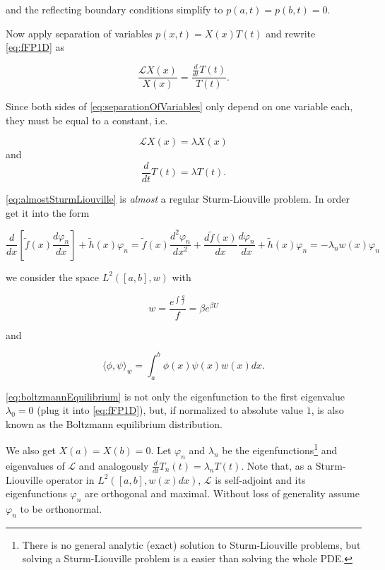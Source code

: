and the reflecting boundary conditions simplify to $p(a,t)=p(b,t)=0$.

Now apply separation of variables $p(x,t)=X(x)T(t)$ and rewrite \eqref{eq:fFP1D} as

\begin{equation}\label{eq:separationOfVariables}
\frac{\mathcal{L}X(x)}{X(x)} = \frac{\frac{d}{dt}T(t)}{T(t)}.
\end{equation}

Since both sides of \eqref{eq:separationOfVariables} only depend on one variable each, they must be equal to a constant, i.e.

\begin{equation}\label{eq:almostSturmLiouville}
\mathcal{L}X(x) = \lambda X(x)
\end{equation}
and
\begin{equation*}
\frac{d}{dt}T(t)=\lambda T(t).
\end{equation*}

\eqref{eq:almostSturmLiouville} is \textit{almost} a regular Sturm-Liouville problem. In order get it into the form

\begin{equation*}
\frac{d}{dx}\left[\tilde{f}(x)\frac{d\varphi_n}{dx} \right] + \tilde{h}(x)\varphi_n = \tilde{f}(x)\frac{d^2 \varphi_n}{dx^2} + \frac{d \tilde{f}(x)}{dx}\frac{d \varphi_n}{dx}+ \tilde{h}(x)\varphi_n = -\lambda_n w(x)\varphi_n
\end{equation*}

we consider the space $L^2([a,b],w)$ with 

\begin{equation}\label{eq:boltzmannEquilibrium}
w = \frac{e^{\int \frac{g}{f}}}{f} = \beta e^{\beta U}
\end{equation}

and 

\begin{equation*}
\langle \phi, \psi \rangle_w = \int_a^b \phi(x)\psi(x)w(x)dx.
\end{equation*}

\eqref{eq:boltzmannEquilibrium} is not only the eigenfunction to the first eigenvalue $\lambda_0 = 0$ (plug it into \eqref{eq:fFP1D}), but, if normalized to absolute value $1$, is also known as the Boltzmann equilibrium distribution.

We also get $X(a)=X(b)=0$. Let $\varphi_n$ and $\lambda_n$ be the eigenfunctions\footnote{There is no general analytic (exact) solution to Sturm-Liouville problems, but solving a Sturm-Liouville problem is a easier than solving the whole PDE.} and eigenvalues of $\mathcal{L}$ and analogously $\frac{d}{dt}T_n(t)=\lambda_n T(t)$. Note that, as a Sturm-Liouville operator in $L^2([a,b], w(x)dx)$, $\mathcal{L}$ is self-adjoint and its eigenfunctions $\varphi_n$ are orthogonal and maximal. Without loss of generality assume $\varphi_n$ to be orthonormal.

